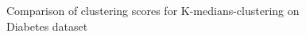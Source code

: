 \begin{figure}[H]
	\centering
	
	\caption{Comparison of clustering scores for K-medians-clustering on Diabetes dataset}%
\end{figure}

